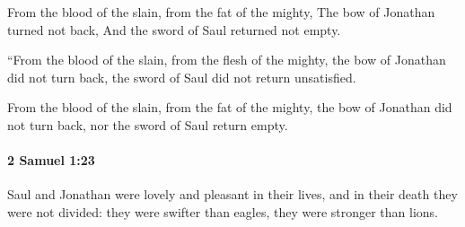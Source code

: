 			\begin{versebox}
					\item[BHS] 
					\item[ASV] From the blood of the slain, from the fat of the mighty, The bow of Jonathan turned not back, And the sword of Saul returned not empty.
					\item[NIV] “From the blood of the slain, from the flesh of the mighty, the bow of Jonathan did not turn back, the sword of Saul did not return unsatisfied.
					\item[NRSV] From the blood of the slain, from the fat of the mighty, the bow of Jonathan did not turn back, nor the sword of Saul return empty.
			\end{versebox}

		\paragraph{2 Samuel 1:23} %
			\label{2SAMUEL-1-23}

			Saul and Jonathan were lovely and pleasant in their lives, and in their death they were not divided: they were swifter than eagles, they were stronger than lions.


